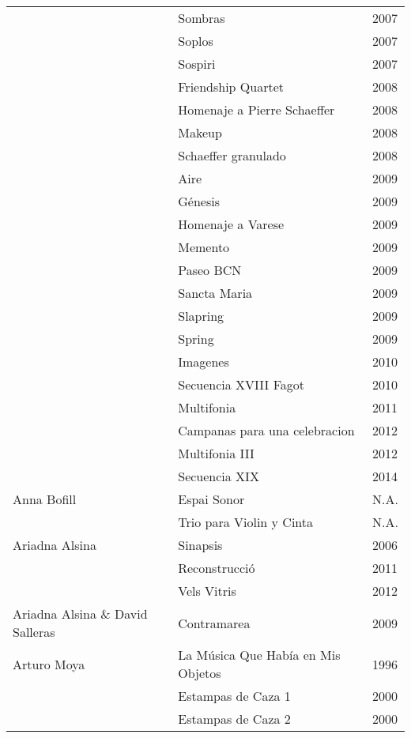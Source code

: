 \begin{center}
\begin{longtable}{ p{}  p{}  p{} }
& Sombras & 2007 \\ \cmidrule (r){2-3} 
& Soplos & 2007 \\ \cmidrule (r){2-3} 
& Sospiri & 2007 \\ \cmidrule (r){2-3} 
& Friendship Quartet & 2008 \\ \cmidrule (r){2-3} 
& Homenaje a Pierre Schaeffer & 2008 \\ \cmidrule (r){2-3} 
& Makeup & 2008 \\ \cmidrule (r){2-3} 
& Schaeffer granulado & 2008 \\ \cmidrule (r){2-3} 
& Aire & 2009 \\ \cmidrule (r){2-3} 
& Génesis & 2009 \\ \cmidrule (r){2-3} 
& Homenaje a Varese & 2009 \\ \cmidrule (r){2-3} 
& Memento & 2009 \\ \cmidrule (r){2-3} 
& Paseo BCN & 2009 \\ \cmidrule (r){2-3} 
& Sancta Maria & 2009 \\ \cmidrule (r){2-3} 
& Slapring & 2009 \\ \cmidrule (r){2-3} 
& Spring & 2009 \\ \cmidrule (r){2-3} 
& Imagenes & 2010 \\ \cmidrule (r){2-3} 
& Secuencia XVIII Fagot & 2010 \\ \cmidrule (r){2-3} 
& Multifonia & 2011 \\ \cmidrule (r){2-3} 
& Campanas para una celebracion & 2012 \\ \cmidrule (r){2-3} 
& Multifonia III & 2012 \\ \cmidrule (r){2-3} 
& Secuencia XIX & 2014 \\ \midrule
Anna Bofill & Espai Sonor & N.A. \\ \cmidrule (r){2-3}
& Trio para Violin y Cinta & N.A. \\ \midrule 
Ariadna Alsina & Sinapsis & 2006 \\ \cmidrule (r){2-3}
& Reconstrucció & 2011 \\ \cmidrule (r){2-3}
& Vels Vitris & 2012 \\ \midrule 
Ariadna Alsina \& David Salleras & Contramarea & 2009 \\ \midrule 
Arturo Moya & La Música Que Había en Mis Objetos & 1996 \\ \cmidrule (r){2-3} 
& Estampas de Caza 1 & 2000 \\ \cmidrule (r){2-3} 
& Estampas de Caza 2 & 2000 \\ \cmidrule (r){2-3} 

\end{longtable}
\end{center}
